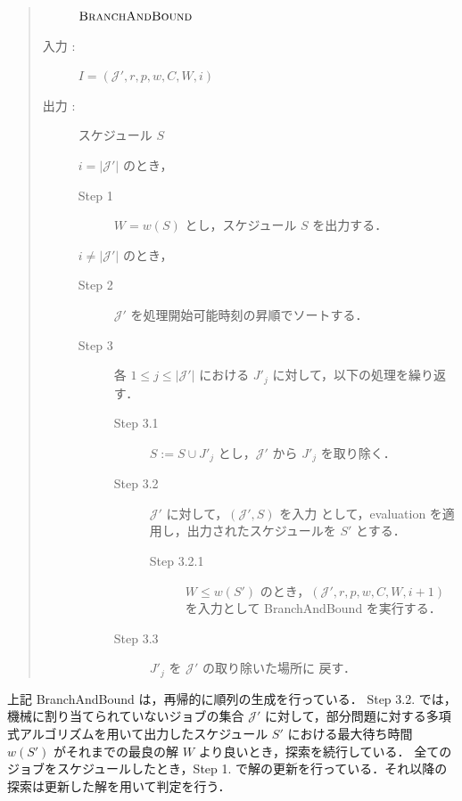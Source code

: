 \documentclass[12pt]{optlab-bachelor}
\begin{document}
\begin{quote}
  \begin{description}
    \item[] ${\mbox {\bf {\sc BranchAndBound}}}$
    \item[入力 :] $I = (\mathcal{J}',r,p,w,C,W,i)$
    \item[出力 :] スケジュール $S$
  \end{description}
  \begin{description}
    \item[] $i = |\mathcal{J}'|$ のとき，
    \begin{description}
      \item[Step 1] $W = w(S)$ とし，スケジュール $S$ を出力する．
    \end{description}
    \item[] $i \neq |\mathcal{J}'|$ のとき，
    \begin{description}
      \item[Step 2] $\mathcal{J}'$ を処理開始可能時刻の昇順でソートする．
      \item[Step 3] 各 $1 \le j \le |\mathcal{J}'|$ における $J'_j$ に対して，以下の処理を繰り返す．
      \begin{description}
        \item[Step 3.1] $S := S \cup J'_j$ とし，$\mathcal{J}'$ から $J'_j$ を取り除く．
        \item[Step 3.2] $\mathcal{J}'$ に対して，$(\mathcal{J}',S)$ を入力
        として，{\sc evaluation} を適用し，出力されたスケジュールを $S'$ とする．
        \begin{description}
          \item[Step 3.2.1] $W \le w(S')$ のとき，$(\mathcal{J}',r,p,w,C,W,i + 1)$ を入力として {\sc BranchAndBound} を実行する．
        \end{description}
        \item[Step 3.3] $J'_j$ を $\mathcal{J}'$ の取り除いた場所に
        戻す．
      \end{description}
    \end{description}
  \end{description}
\end{quote}

上記 {\sc BranchAndBound} は，再帰的に順列の生成を行っている．
Step 3.2. では，機械に割り当てられていないジョブの集合 $\mathcal{J}'$ に対して，部分問題に対する多項式アルゴリズムを用いて出力したスケジュール $S'$ における最大待ち時間 $w(S')$ がそれまでの最良の解 $W$ より良いとき，探索を続行している．
全てのジョブをスケジュールしたとき，Step 1. で解の更新を行っている．それ以降の探索は更新した解を用いて判定を行う．
\end{document}
